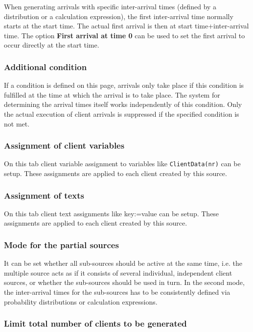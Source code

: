 When generating arrivals with specific inter-arrival times (defined by a distribution
or a calculation expression), the first inter-arrival time normally starts at the start time.
The actual first arrival is then at start time+inter-arrival time. The option
\textbf{First arrival at time 0} can be used to set the first arrival to occur
directly at the start time.

\subsubsection*{Additional condition}

If a condition is defined on this page, arrivals only take place
if this condition is fulfilled at the time at which the arrival is to take place.
The system for determining the arrival times itself works independently of this condition.
Only the actual execution of client arrivals is suppressed if the specified condition is not met.

\subsubsection*{Assignment of client variables}

On this tab client variable assignment to variables like \texttt{ClientData(nr)} can be setup.
These assignments are applied to each client created by this source.

\subsubsection*{Assignment of texts}

On this tab client text assignments like key:=value can be setup.
These assignments are applied to each client created by this source.

\subsubsection*{Mode for the partial sources}

It can be set whether all sub-sources should be active at the same time, i.e. the
multiple source acts as if it consists of several individual, independent client sources,
or whether the sub-sources should be used in turn. In the second mode, the inter-arrival times
for the sub-sources has to be consistently defined via probability distributions or calculation expressions.

\subsubsection*{Limit total number of clients to be generated}

